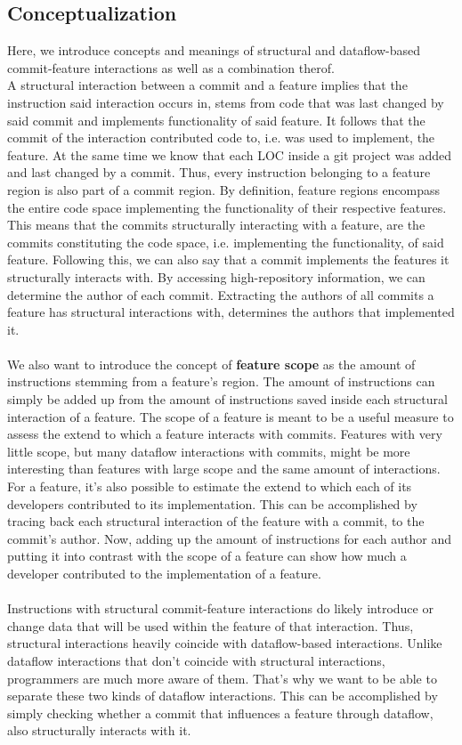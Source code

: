 \subsection*{Conceptualization}

Here, we introduce concepts and meanings of structural and dataflow-based commit-feature interactions as well as a combination therof.  \\
A structural interaction between a commit and a feature implies that the instruction said interaction occurs in, stems from code that was last changed by said commit and implements functionality of said feature.
It follows that the commit of the interaction contributed code to, i.e. was used to implement, the feature. 
At the same time we know that each LOC inside a git project was added and last changed by a commit. 
Thus, every instruction belonging to a feature region is also part of a commit region.
By definition, feature regions encompass the entire code space implementing the functionality of their respective features.
This means that the commits structurally interacting with a feature, are the commits constituting the code space, i.e. implementing the functionality, of said feature.
Following this, we can also say that a commit implements the features it structurally interacts with.
By accessing high-repository information, we can determine the author of each commit.
Extracting the authors of all commits a feature has structural interactions with, determines the authors that implemented it. \\ \\
We also want to introduce the concept of \textbf{feature scope} as the amount of instructions stemming from a feature's region.
The amount of instructions can simply be added up from the amount of instructions saved inside each structural interaction of a feature. 
The scope of a feature is meant to be a useful measure to assess the extend to which a feature interacts with commits.
Features with very little scope, but many dataflow interactions with commits, might be more interesting than features with large scope and the same amount of interactions. \\
For a feature, it's also possible to estimate the extend to which each of its developers contributed to its implementation.
This can be accomplished by tracing back each structural interaction of the feature with a commit, to the commit's author.
Now, adding up the amount of instructions for each author and putting it into contrast with the scope of a feature can show how much a developer contributed to the implementation of a feature. \\ \\
Instructions with structural commit-feature interactions do likely introduce or change data that will be used within the feature of that interaction.
Thus, structural interactions heavily coincide with dataflow-based interactions. 
Unlike dataflow interactions that don't coincide with structural interactions, programmers are much more aware of them.
That's why we want to be able to separate these two kinds of dataflow interactions.
This can be accomplished by simply checking whether a commit that influences a feature through dataflow, also structurally interacts with it.

